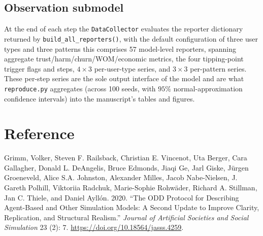 \documentclass[11pt]{article}
\newcommand{\code}[1]{\texttt{#1}}
\begin{document}
\subsection{Observation submodel}
\label{sub:observation}

At the end of each step the \code{DataCollector} evaluates the reporter dictionary
returned by \code{build\_all\_reporters()}, with the default configuration of
three user types and three patterns this comprises 57 model-level reporters,
spanning aggregate trust/harm/churn/WOM/economic metrics, the four
tipping-point trigger flags and steps, $4\times3$ per-user-type series, and
$3\times3$ per-pattern series. These per-step series are the sole output interface
of the model and are what \code{reproduce.py} aggregates (across 100 seeds, with
$95\%$ normal-approximation confidence intervals) into the manuscript's tables and
figures.

\section*{Reference}

\noindent Grimm, Volker, Steven F. Railsback, Christian E. Vincenot, Uta Berger,
Cara Gallagher, Donald L. DeAngelis, Bruce Edmonds, Jiaqi Ge, Jarl Giske,
J\"urgen Groeneveld, Alice S.A. Johnston, Alexander Milles, Jacob Nabe-Nielsen,
J. Gareth Polhill, Viktoriia Radchuk, Marie-Sophie Rohw\"ader, Richard A. Stillman,
Jan C. Thiele, and Daniel Ayllón. 2020. ``The ODD Protocol for Describing
Agent-Based and Other Simulation Models: A Second Update to Improve Clarity,
Replication, and Structural Realism.'' \emph{Journal of Artificial Societies and
Social Simulation} 23 (2): 7. \url{https://doi.org/10.18564/jasss.4259}.
\end{document}
